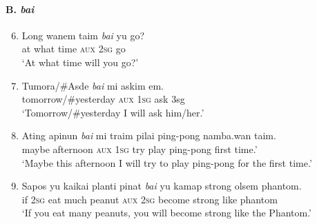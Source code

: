 {\paragraph*{B. \textit{bai}}
\begin{enumerate} \setcounter{enumi}{5}
\item  
\gll Long  wanem  taim  \textit{bai}  yu  go?\\
at  what  time  \textsc{aux}  \textsc{2sg}  go\\
\glt ‘At what time will you go?’ 
\item  
\gll Tumora/\#Asde  \textit{bai}  mi  askim  em.\\
tomorrow/\#yesterday  \textsc{aux}  \textsc{1sg}  ask  3sg\\
\glt ‘Tomorrow/\#yesterday I will ask him/her.’
\item  
\gll Ating  apinun  \textit{bai}  mi  traim  pilai  ping-pong  namba.wan  taim.\\
maybe  afternoon  \textsc{aux}  \textsc{1sg}  try  play  ping-pong  first  time.’\\
\glt ‘Maybe this afternoon I will try to play ping-pong for the first time.’  
\item  
\gll   Sapos  yu  kaikai  planti  pinat  \textit{bai}  yu  kamap  strong  olsem  phantom.\\
if  \textsc{2sg}  eat  much  peanut  \textsc{aux}  \textsc{2sg}  become  strong  like  phantom\\
\glt ‘If you eat many peanuts, you will become strong like the Phantom.’ 
\end{enumerate}

}
